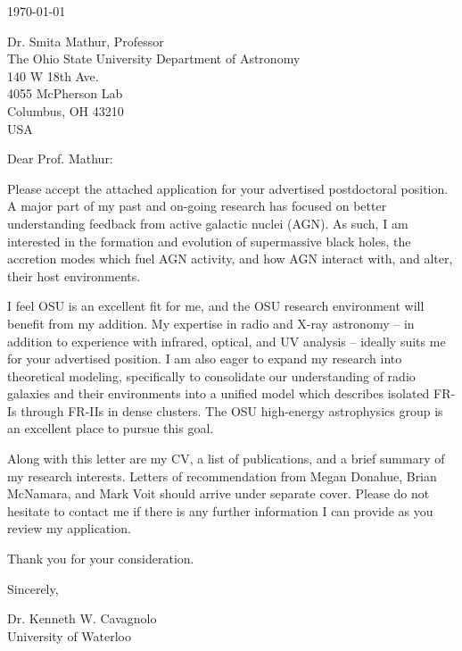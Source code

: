 \documentclass[12pt]{article}
\begin{document}
\today

Dr. Smita Mathur, Professor\\
The Ohio State University Department of Astronomy\\
140 W 18th Ave.\\
4055 McPherson Lab\\
Columbus, OH 43210\\
USA

Dear Prof. Mathur:

Please accept the attached application for your advertised
postdoctoral position. A major part of my past and on-going research
has focused on better understanding feedback from active galactic
nuclei (AGN). As such, I am interested in the formation and evolution
of supermassive black holes, the accretion modes which fuel AGN
activity, and how AGN interact with, and alter, their host
environments.

I feel OSU is an excellent fit for me, and the OSU research
environment will benefit from my addition. My expertise in radio and
X-ray astronomy -- in addition to experience with infrared, optical,
and UV analysis -- ideally suits me for your advertised position. I am
also eager to expand my research into theoretical modeling,
specifically to consolidate our understanding of radio galaxies and
their environments into a unified model which describes isolated FR-Is
through FR-IIs in dense clusters. The OSU high-energy astrophysics
group is an excellent place to pursue this goal.

Along with this letter are my CV, a list of publications, and a brief
summary of my research interests. Letters of recommendation from Megan
Donahue, Brian McNamara, and Mark Voit should arrive under separate
cover. Please do not hesitate to contact me if there is any further
information I can provide as you review my application.

Thank you for your consideration.

Sincerely,\\
\begin{minipage}{7.5in}
\end{minipage}
Dr. Kenneth W. Cavagnolo\\
University of Waterloo
\end{document}
